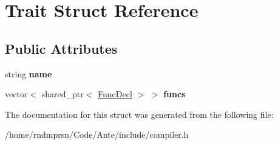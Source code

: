 \hypertarget{structTrait}{}\section{Trait Struct Reference}
\label{structTrait}
\subsection*{Public Attributes}
\begin{DoxyCompactItemize}
\item 
\mbox{\label{structTrait_ab59bc73cb96cac338431039baff7673f}} 
string {\bfseries name}
\item 
\mbox{\label{structTrait_ada8cbf37cb33497fc160c02b7e5be787}} 
vector$<$ shared\+\_\+ptr$<$ \hyperlink{structFuncDecl}{Func\+Decl} $>$ $>$ {\bfseries funcs}
\end{DoxyCompactItemize}


The documentation for this struct was generated from the following file\+:\begin{DoxyCompactItemize}
\item 
/home/rndmprsn/\+Code/\+Ante/include/compiler.\+h\end{DoxyCompactItemize}
